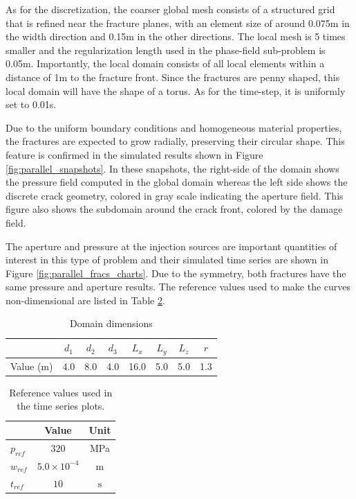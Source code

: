 As for the discretization, the coarser global mesh consists of a structured grid that is refined near the fracture planes, with an element size of around 0.075m in the width direction and 0.15m in the other directions. The local mesh is 5 times smaller and the regularization length used in the phase-field sub-problem is 0.05m. Importantly, the local domain consists of all local elements within a distance of 1m to the fracture front. Since the fractures are penny shaped, this local domain will have the shape of a torus. As for the time-step, it is uniformly set to 0.01s.

Due to the uniform boundary conditions and homogeneous material properties, the fractures are expected to grow radially, preserving their circular shape. This feature is confirmed in the simulated results shown in Figure \ref{fig:parallel_snapshots}. In these snapshots, the right-side of the domain shows the pressure field computed in the global domain whereas the left side shows the discrete crack geometry, colored in gray scale indicating the aperture field. This figure also shows the subdomain around the crack front, colored by the damage field.

The aperture and pressure at the injection sources are important quantities of interest in this type of problem and their simulated time series are shown in Figure \ref{fig:parallel_fracs_charts}. Due to the symmetry, both fractures have the same pressure and aperture results. The reference values used to make the curves non-dimensional are listed in Table \ref{parallel_refs}.

\begin{table}[ht]
  \centering
  \caption{Domain dimensions}
  \begin{tabular}[t]{lccccccc}
  \hline
  &$d_1$&$d_2$&$d_3$&$L_x$&$L_y$&$L_z$&$r$\\  
  \hline
  Value (m) & 4.0 & 8.0 & 4.0 & 16.0 & 5.0 & 5.0 & 1.3\\
  \hline
  \end{tabular}
  \label{parallel_measures}
\end{table}%

\begin{table}[ht]
  \centering
  \caption{Reference values used in the time series plots.}
  \begin{tabular}[t]{lcc}
  \hline
  &Value &Unit \\
  \hline
  $p_{ref}$&$320$&MPa\\
  $w_{ref}$&$5.0\times10^{-4}$&m\\
  $t_{ref}$&$10$&$\text{s}$\\
  \hline
  \end{tabular}
  \label{parallel_refs}
\end{table}%

